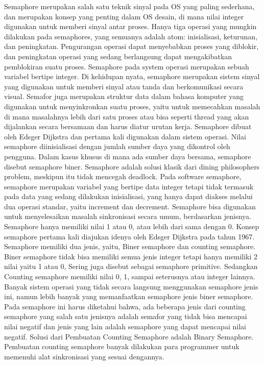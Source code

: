 		Semaphore merupakan salah satu teknik sinyal pada OS yang paling sederhana, dan merupakan konsep yang penting dalam OS desain, di mana nilai integer digunakan untuk memberi sinyal antar proses. 
		Hanya tiga operasi yang mungkin dilakukan pada semaphores, yang semuanya adalah atom: inisialisasi, keturunan, dan peningkatan. 
		Pengurangan operasi dapat menyebabkan proses yang diblokir, dan peningkatan operasi yang sedang berlangsung dapat mengakibatkan pemblokiran suatu proses. 
		Semaphore pada system operasi merupakan sebuah variabel bertipe integer. Di kehidupan nyata, semaphore merupakan sistem sinyal yang digunakan untuk memberi sinyal atau tanda dan berkomunikasi secara visual. 
		Semafor juga merupakan struktur data dalam bahasa komputer yang digunakan untuk menyinkronkan suatu proses, yaitu untuk memecahkan masalah di mana masalahnya lebih dari satu proses atau bisa 
		seperti thread yang akan dijalankan secara bersamaan dan harus diatur urutan kerja. Semaphore dibuat oleh Edsger Dijkstra dan pertama kali digunakan dalam sistem operasi.
		Nilai semaphore diinisialisasi dengan jumlah sumber daya yang dikontrol oleh pengguna. Dalam kasus khusus di mana ada sumber daya bersama, semaphore disebut semaphore biner. 
		Semaphore adalah solusi klasik dari dining philosophers problem, meskipun itu tidak mencegah deadlock.
		Pada software semaphore, semaphore merupakan variabel yang bertipe data integer tetapi tidak termasuk pada data yang sedang dilakukan inisialisasi, yang hanya dapat diakses melalui dua operasi standar, yaitu increment dan decrement. 
		Semaphore bisa digunakan untuk menyelesaikan masalah sinkronisasi secara umum, berdasarkan jenisnya. Semaphore hanya memiliki nilai 1 atau 0, atau lebih dari sama dengan 0. 
		Konsep semaphore pertama kali diajukan idenya oleh Edsger Dijkstra pada tahun 1967. Semaphore memiliki dua jenis, yaitu, Biner semaphore dan counting semaphore. 
		Biner semaphore tidak bisa memiliki semua jenis integer tetapi hanya memiliki 2 nilai yaitu 1 atau 0, Sering juga disebut sebagai semaphore primitive. Sedangkan Counting semaphore memiliki nilai 0, 1, sampai seterusnya atau integer lainnya. 
		Banyak sistem operasi yang tidak secara langsung menggunakan semaphore jenis ini, namun lebih banyak yang memanfaatkan semaphore jenis biner semaphore. 
		Pada semaphore ini harus diketahui bahwa, ada beberapa jenis dari counting semaphore yang salah satu jenisnya adalah semafor yang tidak bisa mencapai nilai negatif dan jenis yang lain adalah semaphore yang dapat mencapai nilai negatif. 
		Solusi dari Pembuatan Counting Semaphore adalah Binary Semaphore. Pembuatan counting semaphore banyak dilakukan para programmer untuk memenuhi alat sinkronisasi yang sesuai dengannya. 
		
